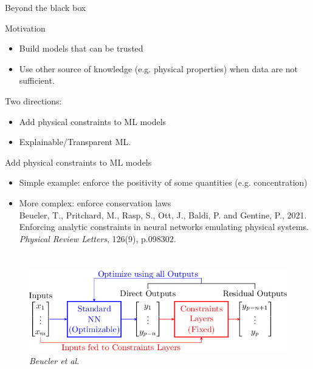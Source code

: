 \documentclass[handout]{beamer}
\newcommand{\rref}[1][]{\hfill{\scriptsize\textit{#1}}}
\begin{document}
\begin{frame}{Beyond the black box}
\begin{block}{Motivation}
\begin{itemize}
    \item Build models that can be trusted
    \item Use other source of knowledge (e.g. physical properties) when data are not sufficient.
\end{itemize}
\end{block}

Two directions:
\begin{itemize}
    \item Add physical constraints to ML models
    \item Explainable/Transparent ML.
\end{itemize}


\end{frame}


\begin{frame}{Add physical constraints to ML models}
\begin{itemize}
    \item \alert{Simple example}: enforce the positivity of some quantities (e.g. concentration)
    \item \alert{More complex}: enforce conservation laws\\
    {\small
Beucler, T., Pritchard, M., Rasp, S., Ott, J., Baldi, P. and Gentine, P., 2021. Enforcing analytic constraints in neural networks emulating physical systems. {\it Physical Review Letters}, 126(9), p.098302.}
\end{itemize}
\begin{columns}
\begin{figure}
    \centering
    \includegraphics[width=\textwidth]{fig/L3/3-Figure2-1.png}\\
\rref[Beucler et al.]
\end{figure}
\end{columns}
\end{frame}
\end{document}
